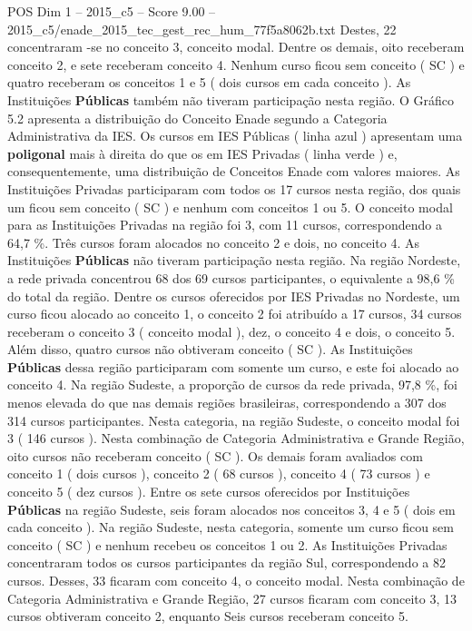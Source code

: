 \begin{textsample}{POS Dim 1 – 2015\_c5 – Score 9.00 – 2015\_c5/enade\_2015\_tec\_gest\_rec\_hum\_77f5a8062b.txt}
Destes, 22 concentraram -se no conceito 3, conceito modal.
Dentre os demais, oito receberam conceito 2, e sete receberam conceito 4.
Nenhum curso ficou sem conceito ( SC ) e quatro receberam os conceitos 1 e 5 ( dois cursos em cada conceito ).
As Instituições \textbf{Públicas} também não tiveram participação nesta região.
O Gráfico 5.2 apresenta a distribuição do Conceito Enade segundo a Categoria Administrativa da IES.
Os cursos em IES Públicas ( linha azul ) apresentam uma \textbf{poligonal} mais à direita do que os em IES Privadas ( linha verde ) e, consequentemente, uma distribuição de Conceitos Enade com valores maiores.
As Instituições Privadas participaram com todos os 17 cursos nesta região, dos quais um ficou sem conceito ( SC ) e nenhum com conceitos 1 ou 5.
O conceito modal para as Instituições Privadas na região foi 3, com 11 cursos, correspondendo a 64,7 \%.
Três cursos foram alocados no conceito 2 e dois, no conceito 4.
As Instituições \textbf{Públicas} não tiveram participação nesta região.
Na região Nordeste, a rede privada concentrou 68 dos 69 cursos participantes, o equivalente a 98,6 \% do total da região.
Dentre os cursos oferecidos por IES Privadas no Nordeste, um curso ficou alocado ao conceito 1, o conceito 2 foi atribuído a 17 cursos, 34 cursos receberam o conceito 3 ( conceito modal ), dez, o conceito 4 e dois, o conceito 5.
Além disso, quatro cursos não obtiveram conceito ( SC ).
As Instituições \textbf{Públicas} dessa região participaram com somente um curso, e este foi alocado ao conceito 4.
Na região Sudeste, a proporção de cursos da rede privada, 97,8 \%, foi menos elevada do que nas demais regiões brasileiras, correspondendo a 307 dos 314 cursos participantes.
Nesta categoria, na região Sudeste, o conceito modal foi 3 ( 146 cursos ).
Nesta combinação de Categoria Administrativa e Grande Região, oito cursos não receberam conceito ( SC ).
Os demais foram avaliados com conceito 1 ( dois cursos ), conceito 2 ( 68 cursos ), conceito 4 ( 73 cursos ) e conceito 5 ( dez cursos ).
Entre os sete cursos oferecidos por Instituições \textbf{Públicas} na região Sudeste, seis foram alocados nos conceitos 3, 4 e 5 ( dois em cada conceito ).
Na região Sudeste, nesta categoria, somente um curso ficou sem conceito ( SC ) e nenhum recebeu os conceitos 1 ou 2.
As Instituições Privadas concentraram todos os cursos participantes da região Sul, correspondendo a 82 cursos.
Desses, 33 ficaram com conceito 4, o conceito modal.
Nesta combinação de Categoria Administrativa e Grande Região, 27 cursos ficaram com conceito 3, 13 cursos obtiveram conceito 2, enquanto Seis cursos receberam conceito 5.

\end{textsample}
